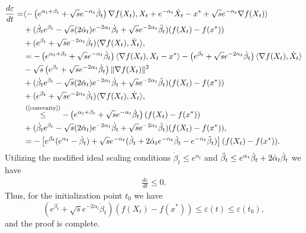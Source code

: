 \documentclass{article}
\theoremstyle{plain}
\theoremstyle{definition}
\theoremstyle{remark}
\begin{document}
\begin{align}
     \frac{d \varepsilon}{dt}=& \langle -\left(e^{\alpha_t+\beta_t}+\sqrt{s}e^{-\alpha_t}\dot \beta_t \right)\nabla f(X_t),X_t+e^{-\alpha_t}\dot X_t-x^*+\sqrt{s}e^{-\alpha_t}\nabla f(X_t) \rangle \nonumber \\
     &+(\dot \beta_te^{\beta_t}-\sqrt{s}(2\dot \alpha_t)e^{-2\alpha_t}\dot \beta_t +\sqrt{s}e^{-2\alpha_t}\Ddot{\beta_t})(f(X_t)-f(x^*))\nonumber\\
    &+(e^{\beta_t}+\sqrt{s}e^{-2\alpha_t}\dot \beta_t)\langle\nabla f(X_t),\dot X_t\rangle,\nonumber\\
     &= -\left(e^{\alpha_t+\beta_t}+\sqrt{s}e^{-\alpha_t}\dot \beta_t \right)\langle\nabla f(X_t),X_t-x^*\rangle -\left(e^{\beta_t}+\sqrt{s}e^{-2\alpha_t}\dot \beta_t \right)\langle \nabla f(X_t),\dot X_t\rangle \nonumber\\
     &-\sqrt{s}\left(e^{\beta_t}+\sqrt{s}e^{-2\alpha_t}\dot \beta_t \right)\|\nabla f(X_t)\|^2\nonumber\\
     &+(\dot \beta_te^{\beta_t}-\sqrt{s}(2\dot \alpha_t)e^{-2\alpha_t}\dot \beta_t +\sqrt{s}e^{-2\alpha_t}\Ddot{\beta_t})(f(X_t)-f(x^*))\nonumber\\
    &+(e^{\beta_t}+\sqrt{s}e^{-2\alpha_t}\dot \beta_t)\langle\nabla f(X_t),\dot X_t\rangle,\nonumber\\
     & \overset{\text{(\ref{convexity}})}{\leq} -\left(e^{\alpha_t+\beta_t}+\sqrt{s}e^{-\alpha_t}\dot \beta_t \right)(f(X_t)-f(x^*))\nonumber\\
     &+(\dot \beta_te^{\beta_t}-\sqrt{s}(2\dot \alpha_t)e^{-2\alpha_t}\dot \beta_t +\sqrt{s}e^{-2\alpha_t}\Ddot{\beta_t})(f(X_t)-f(x^*)),\nonumber\\
     & = -\left[e^{\beta_t}(e^{\alpha_t}-\dot \beta_t)+\sqrt{s}e^{-\alpha_t}(\dot \beta_t+2\dot \alpha_t e^{-\alpha_t}\dot \beta_t-e^{-\alpha_t}\Ddot{\beta}_t)\right](f(X_t)-f(x^*)).\nonumber
\end{align}
Utilizing the modified ideal scaling conditions $\dot \beta_t\leq e^{\alpha_t}$ and $\Ddot{\beta}_t\leq e^{\alpha_t}\dot \beta_t + 2\dot \alpha_t \dot \beta_t$ we have
\begin{align}
     \frac{d \varepsilon}{dt}\leq 0.\nonumber
\end{align}
Thus, for the initialization point $t_0$ we have
$$(e^{\beta_t}+\sqrt{s}e^{-2\alpha_t}\dot \beta_t)(f(X_t)-f(x^*))\leq \varepsilon(t)\leq \varepsilon(t_0),$$
and the proof is complete.
\end{document}
